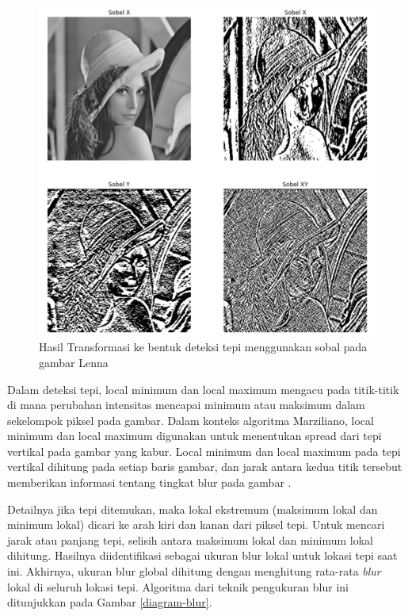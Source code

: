\begin{figure}[H]
	\vspace{-0.1cm}
	\begin{center}
		\includegraphics[width=0.8\columnwidth]{bab3/Gambar/lenna-edge.png}
	\end{center}
	\vspace{-0.2cm}
	\caption{Hasil Transformasi ke bentuk deteksi tepi menggunakan sobal pada gambar Lenna} \label{lenna-edge}
\end{figure}

Dalam deteksi tepi, local minimum dan local maximum mengacu pada titik-titik di mana perubahan intensitas mencapai minimum atau maksimum dalam sekelompok piksel pada gambar. Dalam konteks algoritma Marziliano, local minimum dan local maximum digunakan untuk menentukan spread dari tepi vertikal pada gambar yang kabur. Local minimum dan local maximum pada tepi vertikal dihitung pada setiap baris gambar, dan jarak antara kedua titik tersebut memberikan informasi tentang tingkat blur pada gambar \citep{Marziliano}.

Detailnya jika tepi ditemukan, maka lokal ekstremum (maksimum lokal dan minimum lokal) dicari ke arah kiri dan kanan dari piksel tepi. Untuk mencari jarak atau panjang tepi, selisih antara maksimum lokal dan minimum lokal dihitung. Hasilnya diidentifikasi sebagai ukuran blur lokal untuk lokasi tepi saat ini. Akhirnya, ukuran blur global dihitung dengan menghitung rata-rata \textit{blur} lokal di seluruh lokasi tepi. Algoritma dari teknik pengukuran blur ini ditunjukkan pada Gambar \ref{diagram-blur}.

